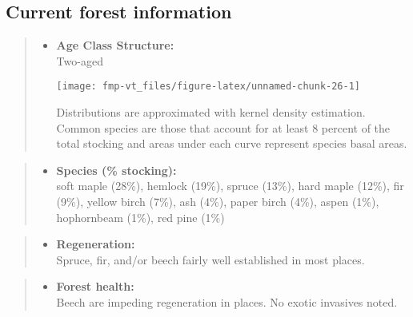 \documentclass[]{tufte-handout}
\providecommand{\tightlist}{%
  \setlength{\itemsep}{0pt}\setlength{\parskip}{0pt}}
\begin{document}
\subsection{Current forest
information}\label{current-forest-information-4}

\begin{quote}
\begin{itemize}
\tightlist
\item
  \textbf{Age Class Structure:}\\
  \vspace{2pt} Two-aged\\

  \begin{marginfigure}
  \texttt{[image: fmp-vt\_files/figure-latex/unnamed-chunk-26-1]} \caption[Distributions are approximated with kernel density estimation]{Distributions are approximated with kernel density estimation. Common species are those that account for at least 8 percent of the total stocking and areas under each curve represent species basal areas.}\label{fig:unnamed-chunk-26}
  \end{marginfigure}
\end{itemize}
\end{quote}

\begin{quote}
\begin{itemize}
\tightlist
\item
  \textbf{Species (\% stocking):}\\
  \vspace{2pt} soft maple (28\%), hemlock (19\%), spruce (13\%), hard
  maple (12\%), fir (9\%), yellow birch (7\%), ash (4\%), paper birch
  (4\%), aspen (1\%), hophornbeam (1\%), red pine (1\%)
\end{itemize}
\end{quote}

\begin{quote}
\begin{itemize}
\tightlist
\item
  \textbf{Regeneration:}\\
  \vspace{2pt} Spruce, fir, and/or beech fairly well established in most
  places.
\end{itemize}
\end{quote}

\begin{quote}
\begin{itemize}
\tightlist
\item
  \textbf{Forest health:}\\
  \vspace{2pt} Beech are impeding regeneration in places. No exotic
  invasives noted.
\end{itemize}
\end{quote}
\end{document}
